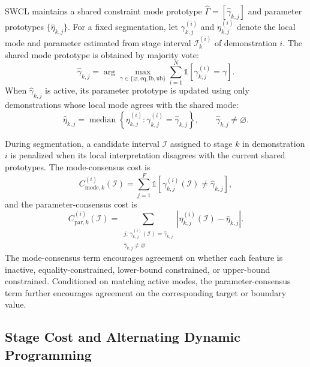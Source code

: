 \documentclass[lettersize,journal]{IEEEtran}
\begin{document}
SWCL maintains a shared constraint mode prototype $\hat{\Gamma}=[\hat{\gamma}_{k,j}]$ and parameter prototypes $\{\hat{\eta}_{k,j}\}$. For a fixed segmentation, let $\gamma_{k,j}^{(i)}$ and $\eta_{k,j}^{(i)}$ denote the local mode and parameter estimated from stage interval $\mathcal{I}_k^{(i)}$ of demonstration $i$. The shared mode prototype is obtained by majority vote:
\begin{equation}
\hat{\gamma}_{k,j}
=
\arg\max_{\gamma\in\{\varnothing,\mathrm{eq},\mathrm{lb},\mathrm{ub}\}}
\sum_{i=1}^{N}
\mathds{1}\!\left[
\gamma_{k,j}^{(i)}=\gamma
\right].
\label{eq:mode_consensus_update}
\end{equation}
When $\hat{\gamma}_{k,j}$ is active, its parameter prototype is updated using only demonstrations whose local mode agrees with the shared mode:
\begin{equation}
\hat{\eta}_{k,j}
=
\operatorname{median}
\left\{
\eta_{k,j}^{(i)}
:
\gamma_{k,j}^{(i)}=\hat{\gamma}_{k,j}
\right\},
\qquad
\hat{\gamma}_{k,j}\neq\varnothing.
\label{eq:param_consensus_update}
\end{equation}

During segmentation, a candidate interval $\mathcal{I}$ assigned to stage $k$ in demonstration $i$ is penalized when its local interpretation disagrees with the current shared prototypes. The mode-consensus cost is
\begin{equation}
C_{\mathrm{mode},k}^{(i)}(\mathcal{I})
=
\sum_{j=1}^{F}
\mathds{1}
\left[
\gamma_{k,j}^{(i)}(\mathcal{I})
\neq
\hat{\gamma}_{k,j}
\right],
\label{eq:mode_consensus_cost}
\end{equation}
and the parameter-consensus cost is
\begin{equation}
C_{\mathrm{par},k}^{(i)}(\mathcal{I})
=
\sum_{\substack{
j:\,
\gamma_{k,j}^{(i)}(\mathcal{I})=\hat{\gamma}_{k,j}\\
\hat{\gamma}_{k,j}\neq\varnothing
}}
\left|
\eta_{k,j}^{(i)}(\mathcal{I})
-
\hat{\eta}_{k,j}
\right|.
\label{eq:param_consensus_cost}
\end{equation}
The mode-consensus term encourages agreement on whether each feature is inactive, equality-constrained, lower-bound constrained, or upper-bound constrained. Conditioned on matching active modes, the parameter-consensus term further encourages agreement on the corresponding target or boundary value.

\subsection{Stage Cost and Alternating Dynamic Programming}
\label{subsec:alternating_dp}
\end{document}
